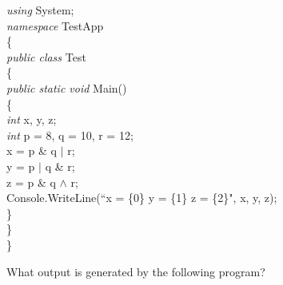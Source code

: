 {\begin{list}{E \thechapter.\theenumi}
\emph{using} System;\\
\emph{namespace} TestApp\\
\{\\
\hspace*{0.2in}    \emph{public class} Test\\
\hspace*{0.2in}    \{\\
\hspace*{0.4in}        \emph{public static void} Main()\\
\hspace*{0.4in}        \{\\
\hspace*{0.6in}            \emph{int} x, y, z;\\
\hspace*{0.6in}            \emph{int} p = 8, q = 10, r = 12;\\
\hspace*{0.6in}            x = p \& q $\vert$ r;\\
\hspace*{0.6in}            y = p $\vert$ q \& r;\\
\hspace*{0.6in}            z = p \& q $\wedge$ r;\\
\hspace*{0.6in}            Console.WriteLine(``x = \{0\}  y =
\{1\}  z = \{2\}", x, y, z);\\
\hspace*{0.4in}        \}\\
\hspace*{0.2in}    \}\\
\}


\item What output is generated by the following program?


\end{list}}
